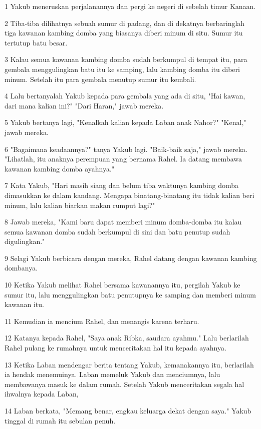 \par 1 Yakub meneruskan perjalanannya dan pergi ke negeri di sebelah timur Kanaan.
\par 2 Tiba-tiba dilihatnya sebuah sumur di padang, dan di dekatnya berbaringlah tiga kawanan kambing domba yang biasanya diberi minum di situ. Sumur itu tertutup batu besar.
\par 3 Kalau semua kawanan kambing domba sudah berkumpul di tempat itu, para gembala menggulingkan batu itu ke samping, lalu kambing domba itu diberi minum. Setelah itu para gembala menutup sumur itu kembali.
\par 4 Lalu bertanyalah Yakub kepada para gembala yang ada di situ, "Hai kawan, dari mana kalian ini?" "Dari Haran," jawab mereka.
\par 5 Yakub bertanya lagi, "Kenalkah kalian kepada Laban anak Nahor?" "Kenal," jawab mereka.
\par 6 "Bagaimana keadaannya?" tanya Yakub lagi. "Baik-baik saja," jawab mereka. "Lihatlah, itu anaknya perempuan yang bernama Rahel. Ia datang membawa kawanan kambing domba ayahnya."
\par 7 Kata Yakub, "Hari masih siang dan belum tiba waktunya kambing domba dimasukkan ke dalam kandang. Mengapa binatang-binatang itu tidak kalian beri minum, lalu kalian biarkan makan rumput lagi?"
\par 8 Jawab mereka, "Kami baru dapat memberi minum domba-domba itu kalau semua kawanan domba sudah berkumpul di sini dan batu penutup sudah digulingkan."
\par 9 Selagi Yakub berbicara dengan mereka, Rahel datang dengan kawanan kambing dombanya.
\par 10 Ketika Yakub melihat Rahel bersama kawanannya itu, pergilah Yakub ke sumur itu, lalu menggulingkan batu penutupnya ke samping dan memberi minum kawanan itu.
\par 11 Kemudian ia mencium Rahel, dan menangis karena terharu.
\par 12 Katanya kepada Rahel, "Saya anak Ribka, saudara ayahmu." Lalu berlarilah Rahel pulang ke rumahnya untuk menceritakan hal itu kepada ayahnya.
\par 13 Ketika Laban mendengar berita tentang Yakub, kemanakannya itu, berlarilah ia hendak menemuinya. Laban memeluk Yakub dan menciumnya, lalu membawanya masuk ke dalam rumah. Setelah Yakub menceritakan segala hal ihwalnya kepada Laban,
\par 14 Laban berkata, "Memang benar, engkau keluarga dekat dengan saya." Yakub tinggal di rumah itu sebulan penuh.
